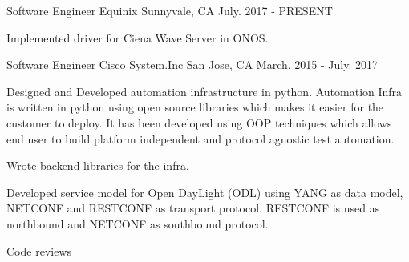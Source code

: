 

\begin{cventries}

  \cventry
    {Software Engineer} %
    {Equinix} %
    {Sunnyvale, CA} %
    {July. 2017 - PRESENT} %
    {
      \begin{cvitems} %
        \item {Implemented driver for Ciena Wave Server in ONOS.}
      \end{cvitems}
    }

  \cventry
    {Software Engineer} %
    {Cisco System.Inc} %
    {San Jose, CA} %
    {March. 2015 - July. 2017} %
    {
      \begin{cvitems} %
        \item {Designed and Developed automation infrastructure in python.
        		Automation Infra is written in python using open source libraries which makes it easier for the customer to deploy.
        		It has been developed using OOP techniques which allows end user to build platform independent and protocol agnostic test automation.}
        \item {Wrote backend libraries for the infra.}
        \item {Developed service model for Open DayLight (ODL) using YANG as data model, NETCONF and RESTCONF as transport protocol.
        		RESTCONF is used as northbound and NETCONF as southbound protocol.}
        \item {Code reviews}
      \end{cvitems}
    }


\end{cventries}
